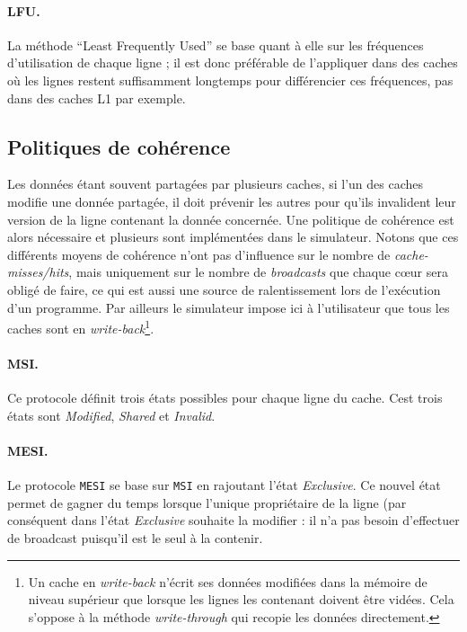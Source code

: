 \paragraph{LFU.}La méthode ``Least Frequently Used'' se base quant à elle sur les fréquences d'utilisation de chaque ligne ; il est donc préférable de l'appliquer dans des caches où les lignes restent suffisamment longtemps pour différencier ces fréquences, pas dans des caches L1 par exemple. 

\subsection{Politiques de cohérence}
\label{coher}

Les données étant souvent partagées par plusieurs caches, si l'un des caches modifie une donnée partagée, il doit prévenir les autres pour qu'ils invalident leur version de la ligne contenant la donnée concernée. Une politique de cohérence est alors nécessaire et plusieurs sont implémentées dans le simulateur. Notons que ces différents moyens de cohérence n'ont pas d'influence sur le nombre de \emph{cache-misses/hits}, mais uniquement sur le nombre de \emph{broadcasts} que chaque c\oe ur sera obligé de faire, ce qui est aussi une source de ralentissement lors de l'exécution d'un programme. Par ailleurs le simulateur impose ici à l'utilisateur que tous les caches sont en \emph{write-back}\footnote{Un cache en \emph{write-back} n'écrit ses données modifiées dans la mémoire de niveau supérieur que lorsque les lignes les contenant doivent être vidées. Cela s'oppose à la méthode \emph{write-through} qui recopie les données directement.}.

\paragraph{MSI.} Ce protocole définit trois états possibles pour chaque ligne du cache. Cest trois états sont \emph{Modified}, \emph{Shared} et \emph{Invalid}.

\paragraph{MESI.} Le protocole \texttt{MESI} se base sur \texttt{MSI} en rajoutant l'état \emph{Exclusive}. Ce nouvel état permet de gagner du temps lorsque l'unique propriétaire de la ligne (par conséquent dans l'état \emph{Exclusive} souhaite la modifier : il n'a pas besoin d'effectuer de broadcast puisqu'il est le seul à la contenir.

